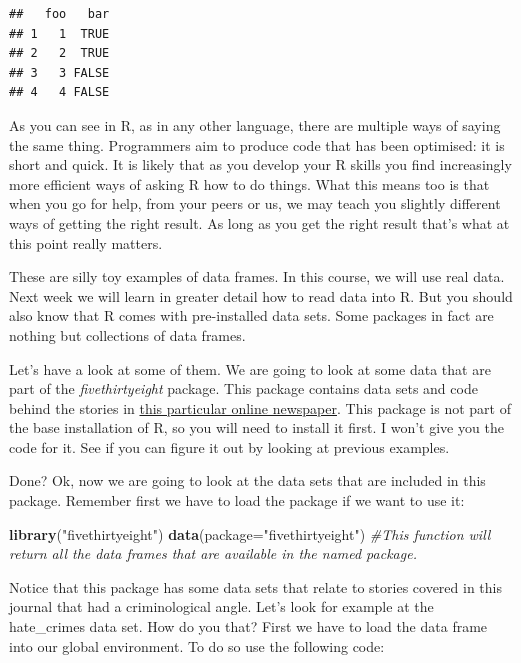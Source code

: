\documentclass[]{book}
\newenvironment{Shaded}{\begin{snugshade}}{\end{snugshade}}
\newcommand{\CommentTok}[1]{\textcolor[rgb]{0.56,0.35,0.01}{\textit{#1}}}
\newcommand{\DataTypeTok}[1]{\textcolor[rgb]{0.13,0.29,0.53}{#1}}
\newcommand{\KeywordTok}[1]{\textcolor[rgb]{0.13,0.29,0.53}{\textbf{#1}}}
\newcommand{\NormalTok}[1]{#1}
\newcommand{\StringTok}[1]{\textcolor[rgb]{0.31,0.60,0.02}{#1}}
\begin{document}
\begin{verbatim}
##   foo   bar
## 1   1  TRUE
## 2   2  TRUE
## 3   3 FALSE
## 4   4 FALSE
\end{verbatim}

As you can see in R, as in any other language, there are multiple ways of saying the same thing. Programmers aim to produce code that has been optimised: it is short and quick. It is likely that as you develop your R skills you find increasingly more efficient ways of asking R how to do things. What this means too is that when you go for help, from your peers or us, we may teach you slightly different ways of getting the right result. As long as you get the right result that's what at this point really matters.

These are silly toy examples of data frames. In this course, we will use real data. Next week we will learn in greater detail how to read data into R. But you should also know that R comes with pre-installed data sets. Some packages in fact are nothing but collections of data frames.

Let's have a look at some of them. We are going to look at some data that are part of the \emph{fivethirtyeight} package. This package contains data sets and code behind the stories in \href{http://fivethirtyeight.com/}{this particular online newspaper}. This package is not part of the base installation of R, so you will need to install it first. I won't give you the code for it. See if you can figure it out by looking at previous examples.

Done? Ok, now we are going to look at the data sets that are included in this package. Remember first we have to load the package if we want to use it:

\begin{Shaded}
\begin{Highlighting}[]
\KeywordTok{library}\NormalTok{(}\StringTok{"fivethirtyeight"}\NormalTok{)}
\KeywordTok{data}\NormalTok{(}\DataTypeTok{package=}\StringTok{"fivethirtyeight"}\NormalTok{) }\CommentTok{#This function will return all the data frames that are available in the named package.}
\end{Highlighting}
\end{Shaded}

Notice that this package has some data sets that relate to stories covered in this journal that had a criminological angle. Let's look for example at the hate\_crimes data set. How do you that? First we have to load the data frame into our global environment. To do so use the following code:
\end{document}
